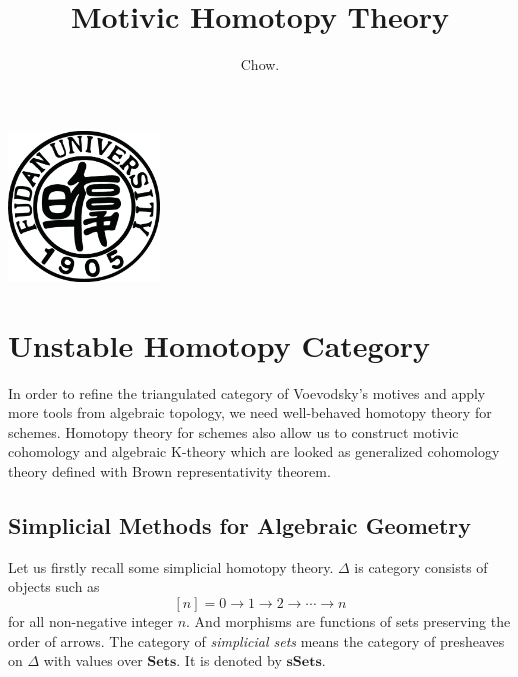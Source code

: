 \documentclass[b5paper,10pt]{article}
\title{Motivic Homotopy Theory}
\author{Chow.}
\date{}
\begin{document}
\maketitle
\begin{center}
	\includegraphics[height=4cm]{PIC/xiaohui.eps}
\end{center}
\tableofcontents
	\section{Unstable Homotopy Category}
	In order to refine the triangulated category of Voevodsky's motives and apply more tools from algebraic topology, we need well-behaved homotopy theory for schemes. Homotopy theory for schemes also allow us to construct motivic cohomology and algebraic K-theory which are looked as generalized cohomology theory defined with Brown representativity theorem.
	\subsection{Simplicial Methods for Algebraic Geometry}
	Let us firstly recall some simplicial homotopy theory.
	$\Delta$ is category consists of objects such as
	\[
	[n]={0 \to 1 \to 2 \to \cdots \to n}
	\]
	for all non-negative integer $n$. And morphisms are functions of sets preserving the order of arrows.
	The category of \emph{simplicial sets} means the category of presheaves on $\Delta$ with values over $\mathbf{Sets}$. It is denoted by $\mathbf{sSets}$.
	
\end{document}
